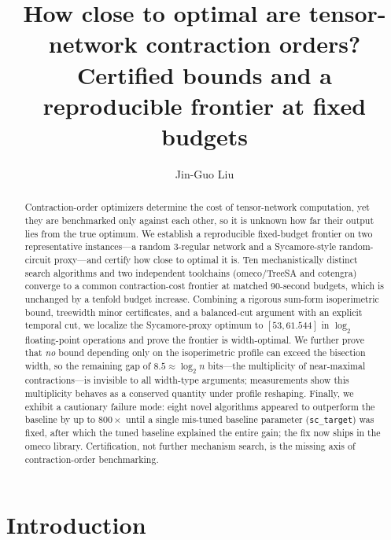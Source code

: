 \documentclass[a4paper,11pt,noarxiv]{quantumarticle}
\begin{document}
\title{How close to optimal are tensor-network contraction orders? Certified bounds and a reproducible frontier at fixed budgets}

\author{Jin-Guo Liu}

\begin{abstract}
Contraction-order optimizers determine the cost of tensor-network computation,
yet they are benchmarked only against each other, so it is unknown how far
their output lies from the true optimum. We establish a reproducible
fixed-budget frontier on two representative instances---a random 3-regular
network and a Sycamore-style random-circuit proxy---and certify how close to
optimal it is. Ten mechanistically distinct search algorithms and two
independent toolchains (\textsf{omeco}/TreeSA and \textsf{cotengra}) converge
to a common contraction-cost frontier at matched 90-second budgets, which is
unchanged by a tenfold budget increase. Combining a rigorous sum-form
isoperimetric bound, treewidth minor certificates, and a balanced-cut argument
with an explicit temporal cut, we localize the Sycamore-proxy optimum to
$[53, 61.544]$ in $\log_2$ floating-point operations and prove the frontier is
width-optimal. We further prove that \emph{no} bound depending only on the
isoperimetric profile can exceed the bisection width, so the remaining gap of
$8.5\approx\log_2 n$ bits---the multiplicity of near-maximal contractions---is
invisible to all width-type arguments; measurements show this multiplicity
behaves as a conserved quantity under profile reshaping. Finally, we exhibit a
cautionary failure mode: eight novel algorithms appeared to outperform the
baseline by up to $800\times$ until a single mis-tuned baseline parameter
(\texttt{sc\_target}) was fixed, after which the tuned baseline explained the
entire gain; the fix now ships in the \textsf{omeco} library. Certification,
not further mechanism search, is the missing axis of contraction-order
benchmarking.
\end{abstract}

\maketitle

\section{Introduction}
\label{sec:intro}
\end{document}
